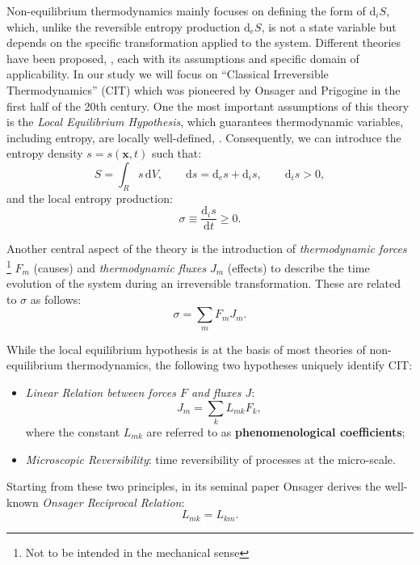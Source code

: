 \documentclass[runningheads]{llncs}
\renewcommand{\d}{\ensuremath{\text{d}}}
\begin{document}
Non-equilibrium thermodynamics mainly focuses on defining the form of $\d_i S$, which, unlike the reversible entropy production $\d_e S$, is not a state variable but depends on the specific transformation applied to the system. 
Different theories have been proposed, \cite{NET}, each with its assumptions and specific domain of applicability. In our study we will focus on \textquotedblleft Classical Irreversible Thermodynamics'' (CIT) which was pioneered by Onsager \cite{onsager} and Prigogine \cite{prigogine} in the first half of the 20th century. One the most important assumptions of this theory is the \textit{Local Equilibrium Hypothesis}, which guarantees thermodynamic variables, including entropy, are locally well-defined, \cite{NET}. 
Consequently, we can introduce the entropy density $s=s(\mathbf{x},t)$ such that:
\begin{equation}
S = \int_{R} s \,\d V, \qquad \d s = \d_e s + \d_is, \qquad \d_is > 0, 
\end{equation}
and the local entropy production:
\begin{equation}
\sigma \equiv \frac{\d_i s}{\d t} \geq 0.
\end{equation}

Another central aspect of the theory is the introduction of \textit{thermodynamic forces} \footnote{Not to be intended in the mechanical sense} $F_m$ (causes) and \textit{thermodynamic fluxes} $J_m$ (effects) to describe the time evolution of the system during an irreversible transformation. These are related to $\sigma$ as follows:
\begin{equation}
\sigma = \sum_m F_m J_m.
\label{2law}
\end{equation}

While the local equilibrium hypothesis is at the basis of most theories of non-equilibrium thermodynamics, the following two hypotheses uniquely identify CIT:
\begin{itemize}
	\item[1.] \textit{Linear Relation between forces $F$ and fluxes $J$}:
	\begin{equation}
	J_m = \sum_k L_{mk} F_k,\label{lin}
	\end{equation}
	where the constant $L_{mk}$ are referred to as \textbf{phenomenological coefficients};
	\item[2.] \textit{Microscopic Reversibility}: time reversibility of processes at the micro-scale. 
\end{itemize}

Starting from these two principles, in its seminal paper \cite{onsager} Onsager derives the well-known \textit{Onsager Reciprocal Relation}:
\begin{equation}
L_{mk}=L_{km}.
\end{equation}
\end{document}
